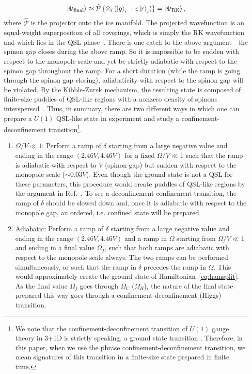 \documentclass[twocolumn,superscriptaddress,amsmath,amssymb,aps,prx,nofootinbib]{revtex4-2}
\begin{document}
\begin{equation}
   \ket{\Psi_{\text{final}}}\approx \hat{\mathcal{P}}\left\{\otimes_{i}\left(\ket{g}_i + \epsilon \ket{r}_i\right)\right\}=\ket{\Psi_{\textrm{RK}}},
\end{equation}
where $\hat{\mathcal{P}}$ is the projector onto the ice manifold. The projected wavefunction is an equal-weight superposition of all coverings, which is simply the RK wavefunction and which lies in the QSL phase~\cite{hermele2004}. There is one catch to the above argument---the spinon gap closes during the above ramp. So it is impossible to be sudden with respect to the monopole scale and yet be strictly adiabatic with respect to the spinon gap throughout the ramp. For a short duration (while the ramp is going through the spinon gap closing), adiabaticity with respect to the spinon gap will be violated. By the Kibble-Zurek mechanism, the resulting state is composed of finite-size puddles of QSL-like regions with a nonzero density of spinons interspersed~\cite{sahay2022quantum, zurek1985cosmological, kibble1976topology, del2014universality}. Thus, in summary, there are two different ways in which one can prepare a $U(1)$ QSL-like state in experiment and study a confinement-deconfinement transition\footnote{We note that the confinement-deconfinement transition of $U(1)$ gauge theory in 3+1D is strictly speaking, a ground state transition \cite{svetitsky1986symmetry,polyakovThermalPropertiesGauge1978}. Therefore, in this paper, when we use the phrase confinement-deconfinement transition, we mean signatures of this transition in a finite-size state prepared in finite time.}.
\begin{enumerate}
    \item \underline{$\Omega/V\ll 1$}: 
    Perform a ramp of $\delta$ starting from a large negative value and ending in the range $(2.46 V, 4.46 V)$ for a fixed $\Omega/V \ll 1$ such that the ramp is adiabatic with respect to $V$ (spinon gap) but sudden with respect to the monopole scale ($\sim 0.03 V$). Even though the ground state is not a QSL for these parameters, this procedure would create puddles of QSL-like regions by the argument in Ref.~\cite{sahay2022quantum}. To see a deconfinement-confinement transition, the ramp of $\delta$ should be slowed down and, once it is adiabatic with respect to the monopole gap, an ordered, i.e. confined state will be prepared.
    \item 
    \underline{Adiabatic:} Perform a ramp of $\delta$ starting from a large negative value and ending in the range $(2.46 V, 4.46 V)$ and a ramp in $\Omega$ starting from $\Omega/V \ll 1$ and ending in a final value $\Omega_f$, such that both ramps are adiabatic with respect to the monopole scale always. The two ramps can be performed simultaneously, or such that the ramp in $\delta$ precedes the ramp in $\Omega$. This would approximately create the ground state of Hamiltonian~\eqref{eq:hamsplit}. As the final value $\Omega_f$ goes through $\Omega_C$ ($\Omega_H$), the nature of the final state prepared this way goes through a confinement-deconfinement (Higgs) transition.
\end{enumerate} 
\end{document}

